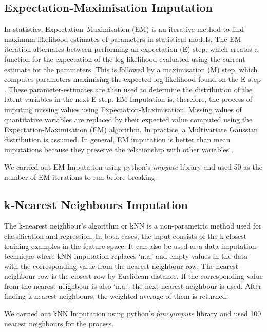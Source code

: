 \subsection{Expectation-Maximisation Imputation}
In statistics, Expectation–Maximisation (EM) is an iterative method to find maximum likelihood estimates of parameters in statistical models. The EM iteration alternates between performing an expectation (E) step, which creates a function for the expectation of the log-likelihood evaluated using the current estimate for the parameters. This is followed by a maximisation (M) step, which computes parameters maximising the expected log-likelihood found on the E step \cite{musil2002comparison}. 
These parameter-estimates are then used to determine the distribution of the latent variables in the next E step. 
EM Imputation is, therefore, the process of imputing missing values using Expectation-Maximisation. Missing values of quantitative variables are replaced by their expected value computed using the Expectation-Maximisation (EM) algorithm. 
In practice, a Multivariate Gaussian distribution is assumed. In general, EM imputation is better than mean imputations because they preserve the relationship with other variables \cite{ambler2007comparison}. 

We carried out EM Imputation using python's \textit{impyute} library and used 50 as the number of EM iterations to run before breaking.


\subsection{k-Nearest Neighbours Imputation}

The k-nearest neighbour's algorithm or kNN is a non-parametric method used for classification and regression. In both cases, the input consists of the k closest training examples in the feature space. It can also be used as a data imputation technique where kNN imputation replaces `n.a.' and empty values in the data with the corresponding value from the nearest-neighbour row. The nearest-neighbour row is the closest row by Euclidean distance. If the corresponding value from the nearest-neighbour is also `n.a.', the next nearest neighbour is used. After finding k nearest neighbours, the weighted average of them is returned.

We carried out kNN Imputation using python's \textit{fancyimpute} library and used 100 nearest neighbours for the process.



